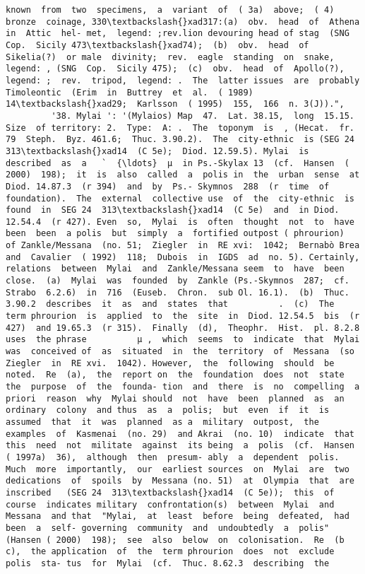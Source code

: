 \documentclass[11pt]{article}
\begin{document}
\begin{Verbatim}[commandchars=\\\{\}]
known  from  two  specimens,  a  variant  of  ( 3a)  above;  ( 4) bronze  coinage, 330\textbackslash{}xad317:(a)  obv.  head  of  Athena  in  Attic  hel- met,  legend: ;rev.lion devouring head of stag  (SNG  Cop.  Sicily 473\textbackslash{}xad74);  (b)  obv.  head  of  Sikelia(?)  or male  divinity;  rev.  eagle  standing  on  snake,  legend: , (SNG  Cop.  Sicily 475);  (c)  obv.  head  of  Apollo(?), legend: ;  rev.  tripod,  legend: .  The  latter issues  are  probably  Timoleontic  (Erim  in  Buttrey  et  al.  ( 1989) 14\textbackslash{}xad29;  Karlsson  ( 1995)  155,  166  n. 3(J)).",
         '38. Mylai ': '(Mylaios) Map  47.  Lat. 38.15,  long  15.15.  Size  of territory: 2.  Type:  A: .  The  toponym  is  , (Hecat.  fr. 79  Steph.  Byz. 461.6;  Thuc. 3.90.2).  The  city-ethnic  is (SEG 24  313\textbackslash{}xad14  (C 5e);  Diod. 12.59.5). Mylai  is  described  as  a   `  {\ldots}  µ  in Ps.-Skylax 13  (cf.  Hansen  ( 2000)  198);  it  is  also  called  a  polis in  the  urban  sense  at  Diod. 14.87.3  (r 394)  and  by  Ps.- Skymnos  288  (r  time  of  foundation).  The  external  collective use  of  the  city-ethnic  is  found  in  SEG 24  313\textbackslash{}xad14  (C 5e)  and  in Diod. 12.54.4  (r 427). Even  so,  Mylai  is  often  thought  not  to  have  been  been  a polis  but  simply  a  fortified outpost ( phrourion)  of Zankle/Messana  (no. 51;  Ziegler  in  RE xvi:  1042;  Bernabò Brea  and  Cavalier  ( 1992)  118;  Dubois  in  IGDS  ad  no. 5). Certainly,  relations  between  Mylai  and  Zankle/Messana seem  to  have  been  close.  (a)  Mylai  was  founded  by  Zankle (Ps.-Skymnos  287;  cf.  Strabo  6.2.6)  in  716  (Euseb.  Chron.  sub Ol. 16.1).  (b)  Thuc. 3.90.2  describes  it  as  and  states  that          .  (c)  The  term phrourion  is  applied  to  the  site  in  Diod. 12.54.5  bis  (r 427)  and 19.65.3  (r 315).  Finally  (d),  Theophr.  Hist.  pl. 8.2.8  uses  the phrase          µ ,  which  seems  to  indicate  that  Mylai  was  conceived of  as  situated  in  the  territory  of  Messana  (so  Ziegler  in  RE xvi.  1042). However,  the  following  should  be  noted.  Re  (a),  the  report on  the  foundation  does  not  state  the  purpose  of  the  founda- tion  and  there  is  no  compelling  a  priori  reason  why  Mylai should  not  have  been  planned  as  an  ordinary  colony  and thus  as  a  polis;  but  even  if  it  is  assumed  that  it  was  planned  as a  military  outpost,  the  examples  of  Kasmenai  (no. 29)  and Akrai  (no. 10)  indicate  that  this  need  not  militate  against  its being  a  polis  (cf.  Hansen  ( 1997a)  36),  although  then  presum- ably  a  dependent  polis.  Much  more  importantly,  our  earliest sources  on  Mylai  are  two  dedications  of  spoils  by  Messana (no. 51)  at  Olympia  that  are  inscribed   (SEG 24  313\textbackslash{}xad14  (C 5e));  this  of  course  indicates military  confrontation(s)  between  Mylai  and  Messana  and that  "Mylai,  at  least  before  being  defeated,  had  been  a  self- governing  community  and  undoubtedly  a  polis"  (Hansen ( 2000)  198);  see  also  below  on  colonisation.  Re  (b  c),  the application  of  the  term phrourion  does  not  exclude  polis  sta- tus  for  Mylai  (cf.  Thuc. 8.62.3  describing  the  
\end{Verbatim}
\end{document}
